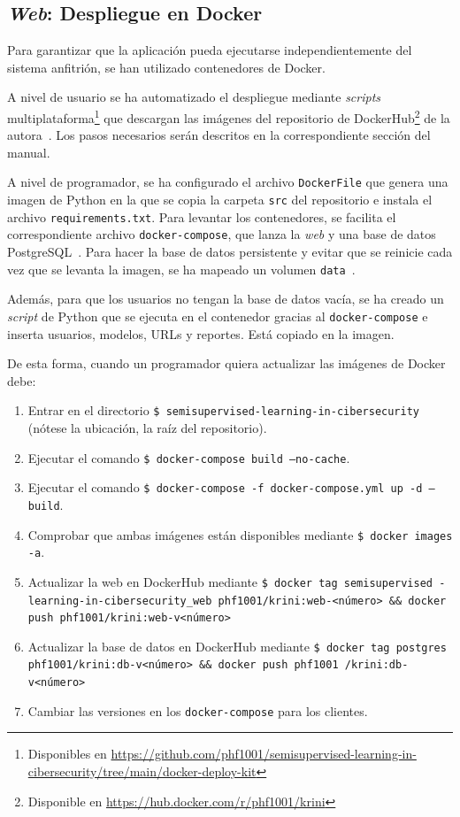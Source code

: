 \subsection{\textit{Web}: Despliegue en Docker}

Para garantizar que la aplicación pueda ejecutarse independientemente del sistema anfitrión, se han utilizado contenedores de Docker.

A nivel de usuario se ha automatizado el despliegue mediante \textit{scripts} multiplataforma\footnote{Disponibles en \url{https://github.com/phf1001/semisupervised-learning-in-cibersecurity/tree/main/docker-deploy-kit}} que descargan las imágenes del repositorio de DockerHub\footnote{Disponible en \url{https://hub.docker.com/r/phf1001/krini}} de la autora~\cite{dockerHub}. Los pasos necesarios serán descritos en la correspondiente sección del manual.

A nivel de programador, se ha configurado el archivo \texttt{DockerFile} que genera una imagen de Python en la que se copia la carpeta \texttt{src} del repositorio e instala el archivo \texttt{requirements.txt}. Para levantar los contenedores, se facilita el correspondiente archivo \texttt{docker-compose}, que lanza la \textit{web} y una base de datos PostgreSQL~\cite{dockerFlaskPostgre}. Para hacer la base de datos persistente y evitar que se reinicie cada vez que se levanta la imagen, se ha mapeado un volumen \texttt{data}~\cite{dockerPersist}.

Además, para que los usuarios no tengan la base de datos vacía, se ha creado un \textit{script} de Python que se ejecuta en el contenedor gracias al \texttt{docker-compose} e inserta usuarios, modelos, URLs y reportes. Está copiado en la imagen.

De esta forma, cuando un programador quiera actualizar las imágenes de Docker debe:

\begin{enumerate}
	\item Entrar en el directorio \texttt{\$ semisupervised-learning-in-cibersecurity} (nótese la ubicación, la raíz del repositorio).
	\item Ejecutar el comando \texttt{\$ docker-compose build --no-cache}.
	\item Ejecutar el comando \texttt{\$ docker-compose -f docker-compose.yml up -d --build}.
	\item Comprobar que ambas imágenes están disponibles mediante \texttt{\$ docker images -a}.
	\item Actualizar la web en DockerHub mediante \texttt{\$ docker tag semisupervised -learning-in-cibersecurity\_web phf1001/krini:web-<número> \&\& docker push phf1001/krini:web-v<número>}
	\item Actualizar la base de datos en DockerHub mediante \texttt{\$ docker tag postgres phf1001/krini:db-v<número> \&\& docker push phf1001 /krini:db-v<número>}
	\item Cambiar las versiones en los \texttt{docker-compose} para los clientes.
\end{enumerate}

